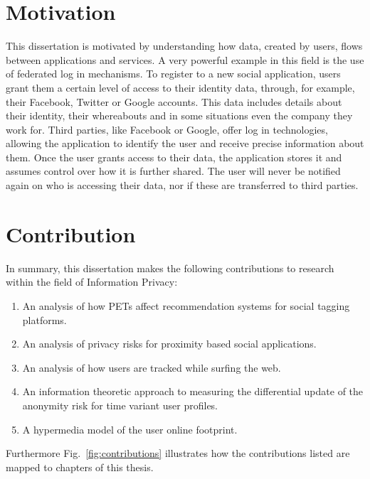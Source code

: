 \section{Motivation}

This dissertation is motivated by understanding how data, created by users, flows between applications and services. A very powerful example in this field is the use of federated log in mechanisms. To register to a new social application, users grant them a certain level of access to their identity data, through, for example, their Facebook, Twitter or Google accounts. This data includes details about their identity, their whereabouts and in some situations even the company they work for. Third parties, like Facebook or Google, offer log in technologies, allowing the application to identify the user and receive precise information about them. Once the user grants access to their data, the application stores it and assumes control over how it is further shared. The user will never be notified again on who is accessing their data, nor if these are transferred to third parties. 

\section{Contribution}

In summary, this dissertation makes the following contributions to research within the field of Information Privacy:

\begin{enumerate}
    \item An analysis of how PETs affect recommendation systems for social tagging platforms.
    \item An analysis of privacy risks for proximity based social applications.
    \item An analysis of how users are tracked while surfing the web.
    \item An information theoretic approach to measuring the differential update of the anonymity risk for time variant user profiles.
    \item A hypermedia model of the user online footprint.
\end{enumerate}

Furthermore Fig.~\ref{fig:contributions} illustrates how the contributions listed are mapped to chapters of this thesis.

